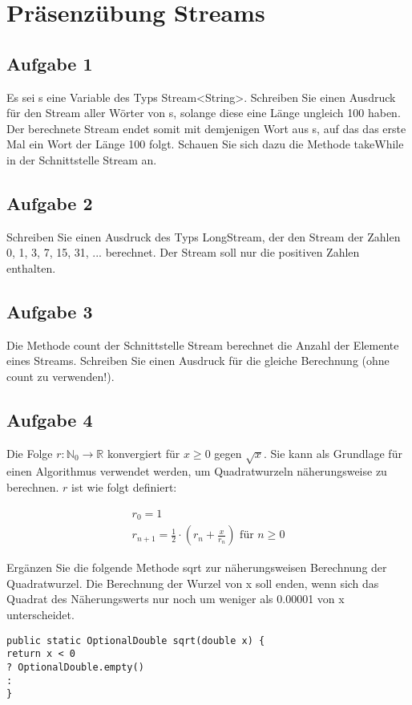 \chapter{Präsenzübung Streams}

\section{Aufgabe 1}

Es sei s eine Variable des Typs Stream<String>.
Schreiben Sie einen Ausdruck für den Stream aller Wörter von s, solange diese eine Länge ungleich
100 haben. Der berechnete Stream endet somit mit demjenigen Wort aus s, auf das das erste Mal
ein Wort der Länge 100 folgt.
Schauen Sie sich dazu die Methode takeWhile in der Schnittstelle Stream an.

\section{Aufgabe 2}

Schreiben Sie einen Ausdruck des Typs LongStream, der den Stream der Zahlen 0, 1, 3, 7, 15, 31,
... berechnet. Der Stream soll nur die positiven Zahlen enthalten.

\section{Aufgabe 3}

Die Methode count der Schnittstelle Stream berechnet die Anzahl der Elemente eines Streams.
Schreiben Sie einen Ausdruck für die gleiche Berechnung (ohne count zu verwenden!).

\section{Aufgabe 4}

Die Folge $r: \mathbb{N}_0 \rightarrow \mathbb{R}$ konvergiert für $x \geq 0$ gegen $\sqrt{x}$. Sie kann als Grundlage für einen Algorithmus
verwendet werden, um Quadratwurzeln näherungsweise zu berechnen. $r$ ist wie folgt definiert:

\begin{align*}
    r_0 = 1 \\
    r_{n + 1} = \frac{1}{2} \cdot \left(r_n + \frac{x}{r_n}\right) \text{ für } n \geq 0
\end{align*}

Ergänzen Sie die folgende Methode sqrt zur näherungsweisen Berechnung der Quadratwurzel. Die
Berechnung der Wurzel von x soll enden, wenn sich das Quadrat des Näherungswerts nur noch um
weniger als 0.00001 von x unterscheidet.

\begin{lstlisting}
public static OptionalDouble sqrt(double x) {
return x < 0
? OptionalDouble.empty()
:
}
\end{lstlisting}